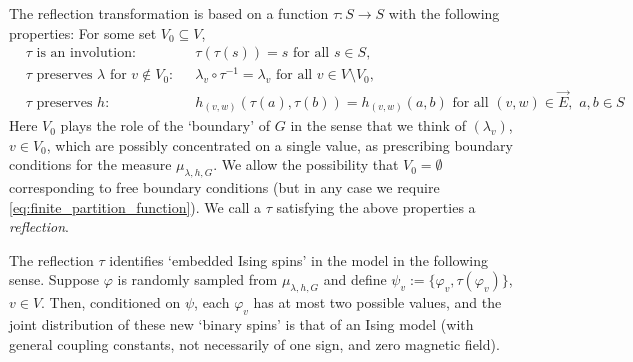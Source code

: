 \documentclass[english]{article}
\theoremstyle{plain}
\theoremstyle{plain}
\begin{document}
The reflection transformation is based on a function $\tau:S\to S$
with the following properties: For some set $V_0\subseteq V$,
\begin{align}
    &\text{$\tau$ is an involution:}&&\text{$\tau(\tau(s)) = s$ for
    all $s\in S$},\label{eq:tau_involution}\\
    &\text{$\tau$ preserves $\lambda$ for $v\notin V_0$:}&&\text{$\lambda_v\circ\tau^{-1} =
    \lambda_v$ for all $v\in V\setminus V_0$},\label{eq:tau_preserves_lambda}\\
    &\text{$\tau$ preserves $h$:}&&\text{$h_{(v,w)}(\tau(a), \tau(b)) =
    h_{(v,w)}(a,b)$ for all $(v,w)\in \vec{E},\,\, a,b\in
    S$}.\label{eq:tau_preserves_h}
\end{align}
Here $V_0$ plays the role of the `boundary' of $G$ in the sense that
we think of $(\lambda_v)$, $v\in V_0$, which are possibly
concentrated on a single value, as prescribing boundary conditions
for the measure $\mu_{\lambda, h, G}$. We allow the possibility that
$V_0 = \emptyset$ corresponding to free boundary conditions (but in
any case we require \eqref{eq:finite_partition_function}). We call a
$\tau$ satisfying the above properties a \emph{reflection}.

The reflection $\tau$ identifies `embedded Ising spins' in the model in the following sense. Suppose $\varphi$ is randomly sampled from $\mu_{\lambda, h, G}$ and define $\psi_v:=\{\varphi_v, \tau(\varphi_v)\}$, $v\in V$. Then, conditioned on $\psi$, each $\varphi_v$ has at most two possible values, and the joint distribution of these new `binary spins' is that of an Ising model (with general coupling constants, not necessarily of one sign, and zero magnetic field).
\end{document}

